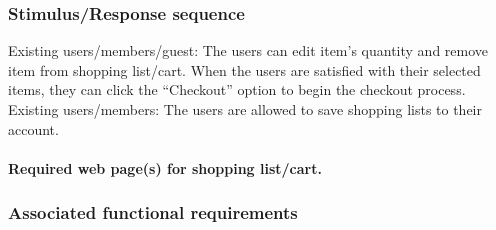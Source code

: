 \documentclass{scrreprt}
\theoremstyle{funreq}
\begin{document}
	\subsubsection{Stimulus/Response sequence}
	Existing users/members/guest:
	The users can edit item’s quantity and remove item from shopping list/cart. When the users are satisfied with their selected items, they can click the “Checkout” option to begin the checkout process. 
	Existing users/members:
	The users are allowed to save shopping lists to their account.
	
	\paragraph[]{\normalfont Required web page(s) for shopping list/cart.}
	
	\subsubsection{Associated functional requirements}
	
\end{document}

